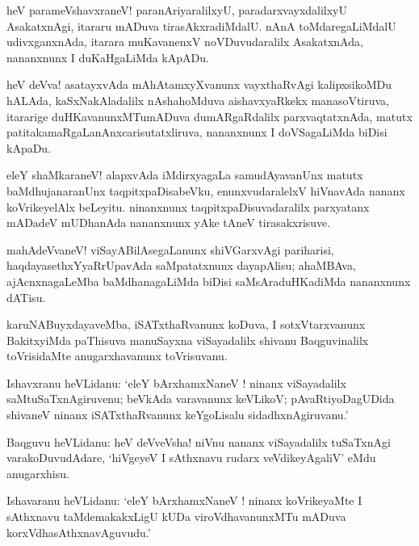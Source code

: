 \documentclass{article}
\begin{document}
\begin{mn}
heV parameVshavxraneV! paranAriyaralilxyU, paradarxvayxdalilxyU AsakatxnAgi, itararu mADuva 
tirasAkxradiMdalU. nAnA toMdaregaLiMdalU udivxganxnAda, itarara muKavanenxV noVDuvudaralilx 
AsakatxnAda, nananxnunx I duKaHgaLiMda kApADu.
\end{mn}

\begin{mn}
heV deVva! asatayxvAda mAhAtamxyXvanunx vayxthaRvAgi kalipxsikoMDu hALAda, kaSxNakAladalilx 
nAshahoMduva aishavxyaRkekx manasoVtiruva, itararige duHKavanunxMTumADuva dumARgaRdalilx 
parxvaqtatxnAda, matutx patitakamaRgaLanAnxcarisutatxliruva, nananxnunx 
I doVSagaLiMda biDisi kApaDu.
\end{mn}

\begin{mn}
eleY shaMkaraneV! alapxvAda iMdirxyagaLa samudAyavanUnx matutx baMdhujanaranUnx 
taqpitxpaDisabeVku, enunxvudaralelxV hiVnavAda nananx koVrikeyelAlx beLeyitu. ninanxnunx 
taqpitxpaDisuvadaralilx parxyatanx mADadeV mUDhanAda nananxnunx yAke tAneV tirasakxrisuve.
\end{mn}

\begin{mn}
mahAdeVvaneV! viSayABilAsegaLanunx shiVGarxvAgi pariharisi, haqdayasethxYyaRrUpavAda saMpatatxnunx 
dayapAlisu; ahaMBAva, ajAcnxnagaLeMba baMdhanagaLiMda biDisi saMsAraduHKadiMda nananxnunx dATisu.
\end{mn}

\begin{mn}
karuNABuyxdayaveMba, iSATxthaRvanunx koDuva, I sotxVtarxvanunx BakitxyiMda paThisuva manuSayxna 
viSayadalilx  shivanu Baqguvinalilx toVrisidaMte anugarxhavanunx toVrisuvanu.
\end{mn}

\begin{mn}
Ishavxranu heVLidanu: `eleY bArxhamxNaneV ! ninanx viSayadalilx saMtuSaTxnAgiruvenu; beVkAda 
varavanunx keVLikoV; 
pAvaRtiyoDagUDida shivaneV ninanx iSATxthaRvanunx keYgoLisalu sidadhxnAgiruvanu.'
\end{mn}

\begin{mn}
Baqguvu heVLidanu: heV deVveVsha! niVnu nananx viSayadalilx tuSaTxnAgi varakoDuvudAdare, 
`hiVgeyeV I sAthxnavu rudarx veVdikeyAgaliV' eMdu anugarxhisu.
\end{mn}

\begin{mn}
Ishavaranu heVLidanu: `eleY bArxhamxNaneV ! ninanx koVrikeyaMte I sAthxnavu taMdemakakxLigU kUDa 
viroVdhavanunxMTu mADuva korxVdhasAthxnavAguvudu.'
\end{mn}
\end{document}

